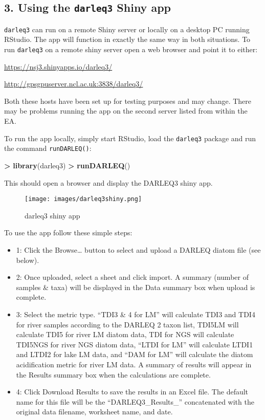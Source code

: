 \documentclass[]{article}
\newenvironment{Shaded}{\begin{snugshade}}{\end{snugshade}}
\newcommand{\KeywordTok}[1]{\textcolor[rgb]{0.13,0.29,0.53}{\textbf{#1}}}
\newcommand{\StringTok}[1]{\textcolor[rgb]{0.31,0.60,0.02}{#1}}
\newcommand{\OperatorTok}[1]{\textcolor[rgb]{0.81,0.36,0.00}{\textbf{#1}}}
\newcommand{\NormalTok}[1]{#1}
\begin{document}
\subsection{\texorpdfstring{3. Using the \texttt{darleq3} Shiny
app}{3. Using the darleq3 Shiny app}}\label{using-the-darleq3-shiny-app}

\texttt{darleq3} can run on a remote Shiny server or locally on a
desktop PC running RStudio. The app will function in exactly the same
way in both situations. To run \texttt{darleq3} on a remote shiny server
open a web browser and point it to either:

\url{https://nsj3.shinyapps.io/darleq3/}

\url{http://gpsgpuserver.ncl.ac.uk:3838/darleq3/}

Both these hosts have been set up for testing purposes and may change.
There may be problems running the app on the second server listed from
within the EA.

To run the app locally, simply start RStudio, load the \texttt{darleq3}
package and run the command \texttt{runDARLEQ()}:

\begin{Shaded}
\begin{Highlighting}[]
\OperatorTok{>}\StringTok{ }\KeywordTok{library}\NormalTok{(darleq3)}
\OperatorTok{>}\StringTok{ }\KeywordTok{runDARLEQ}\NormalTok{()}
\end{Highlighting}
\end{Shaded}

This should open a browser and display the DARLEQ3 shiny app.

\begin{figure}
\centering
\texttt{[image: images/darleq3shiny.png]}
\caption{darleq3 shiny app}
\end{figure}

To use the app follow these simple steps:

\begin{itemize}
\item
  1: Click the Browse\ldots{} button to select and upload a DARLEQ
  diatom file (see below).
\item
  2: Once uploaded, select a sheet and click import. A summary (number
  of samples \& taxa) will be displayed in the Data summary box when
  upload is complete.
\item
  3: Select the metric type. ``TDI3 \& 4 for LM'' will calculate TDI3
  and TDI4 for river samples according to the DARLEQ 2 taxon list,
  TDI5LM will calculate TDI5 for river LM diatom data, TDI for NGS will
  calculate TDI5NGS for river NGS diatom data, ``LTDI for LM'' will
  calculate LTDI1 and LTDI2 for lake LM data, and ``DAM for LM'' will
  calculate the diatom acidification metric for river LM data. A summary
  of results will appear in the Results summary box when the
  calculations are complete.
\item
  4: Click Download Results to save the results in an Excel file. The
  default name for this file will be the ``DARLEQ3\_Results\_''
  concatenated with the original data filename, worksheet name, and
  date.
\end{itemize}
\end{document}
